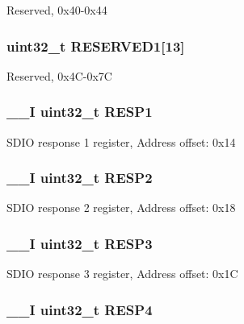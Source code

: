 Reserved, 0x40-\/0x44 \hypertarget{struct_s_d_i_o___type_def_a2d531df35272b1f3d787e5726ed5c52c}{
\subsubsection[{R\-E\-S\-E\-R\-V\-E\-D1}]{\setlength{\rightskip}{0pt plus 5cm}uint32\-\_\-t R\-E\-S\-E\-R\-V\-E\-D1\mbox{[}13\mbox{]}}}\label{struct_s_d_i_o___type_def_a2d531df35272b1f3d787e5726ed5c52c}
Reserved, 0x4\-C-\/0x7\-C \hypertarget{struct_s_d_i_o___type_def_a7b0ee0dc541683266dfab6335abca891}{
\subsubsection[{R\-E\-S\-P1}]{\setlength{\rightskip}{0pt plus 5cm}\-\_\-\-\_\-\-I uint32\-\_\-t R\-E\-S\-P1}}\label{struct_s_d_i_o___type_def_a7b0ee0dc541683266dfab6335abca891}
S\-D\-I\-O response 1 register, Address offset\-: 0x14 \hypertarget{struct_s_d_i_o___type_def_a4d99c78dffdb6e81e8f6b7abec263419}{
\subsubsection[{R\-E\-S\-P2}]{\setlength{\rightskip}{0pt plus 5cm}\-\_\-\-\_\-\-I uint32\-\_\-t R\-E\-S\-P2}}\label{struct_s_d_i_o___type_def_a4d99c78dffdb6e81e8f6b7abec263419}
S\-D\-I\-O response 2 register, Address offset\-: 0x18 \hypertarget{struct_s_d_i_o___type_def_a3da04fbdd44f48a1840e5e0a6295f3cf}{
\subsubsection[{R\-E\-S\-P3}]{\setlength{\rightskip}{0pt plus 5cm}\-\_\-\-\_\-\-I uint32\-\_\-t R\-E\-S\-P3}}\label{struct_s_d_i_o___type_def_a3da04fbdd44f48a1840e5e0a6295f3cf}
S\-D\-I\-O response 3 register, Address offset\-: 0x1\-C \hypertarget{struct_s_d_i_o___type_def_ac760383de212de696f504e744c6fca7e}{
\subsubsection[{R\-E\-S\-P4}]{\setlength{\rightskip}{0pt plus 5cm}\-\_\-\-\_\-\-I uint32\-\_\-t R\-E\-S\-P4}}\label{struct_s_d_i_o___type_def_ac760383de212de696f504e744c6fca7e}

